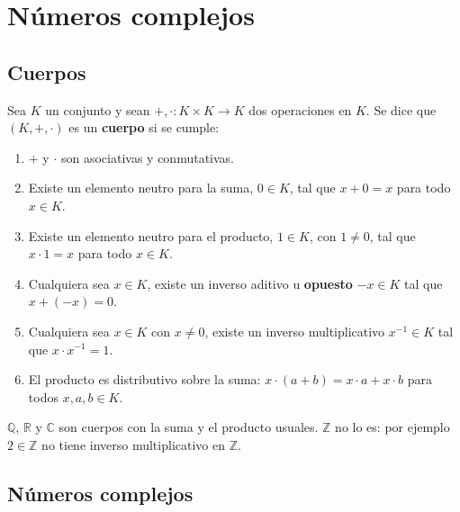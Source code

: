\chapter{Números complejos}
\section{Cuerpos}
\begin{definicion}
Sea $K$ un conjunto y sean $+,\cdot : K\times K\to K$ dos operaciones en $K$.
Se dice que $(K,+,\cdot)$ es un \textbf{cuerpo} si se cumple:
\begin{enumerate}
    \item $+$ y $\cdot$ son asociativas y conmutativas.
    \item Existe un elemento neutro para la suma, $0\in K$, tal que $x+0=x$
    para todo $x\in K$.
    \item Existe un elemento neutro para el producto, $1\in K$, con $1\neq 0$,
    tal que $x\cdot 1=x$ para todo $x\in K$.
    \item Cualquiera sea $x\in K$, existe un inverso aditivo u \textbf{opuesto}
$-x\in K$ tal que $x+(-x)=0$.
    \item Cualquiera sea $x\in K$ con $x\neq 0$, existe un inverso
    multiplicativo $x^{-1}\in K$ tal que $x\cdot x^{-1}=1$.
    \item El producto es distributivo sobre la suma:
$x\cdot(a+b)=x\cdot a+x\cdot b$ para todos $x,a,b\in K$.
\end{enumerate}
\end{definicion}
\begin{ejemplo}
$\mathbb{Q}$, $\mathbb{R}$ y $\mathbb{C}$ son cuerpos con la suma y el producto
usuales. $\mathbb{Z}$ no lo es: por ejemplo $2\in\mathbb{Z}$ no tiene inverso
multiplicativo en $\mathbb{Z}$.
\end{ejemplo}
\section{Números complejos}
